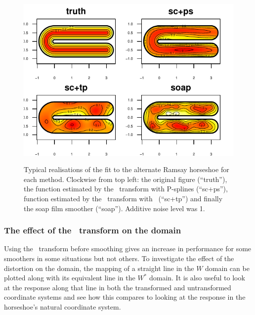 \begin{figure}[t]
\centering
\includegraphics[width=6in]{sc/figs/altramsaycomp.pdf}\\
\caption{Typical realisations of the fit to the alternate Ramsay horseshoe for each method. Clockwise from top left: the original figure (``truth''), the function estimated by the \sch\ transform with P-splines (``sc+ps''), function estimated by the \sch\ transform with \tprss\ (``sc+tp'') and finally the soap film smoother (``soap''). Additive noise level was 1.}
\label{altramsaycomp}
\end{figure}


\subsubsection{The effect of the \sch\ transform on the domain}

Using the \sch\ transform before smoothing gives an increase in performance for some smoothers in some situations but not others. To investigate the effect of the distortion on the domain, the mapping of a straight line in the $W$ domain can be plotted along with its equivalent line in the $W^*$ domain. It is also useful to look at the response along that line in both the transformed and untransformed coordinate systems and see how this compares to looking at the response in the horseshoe's natural coordinate system.

